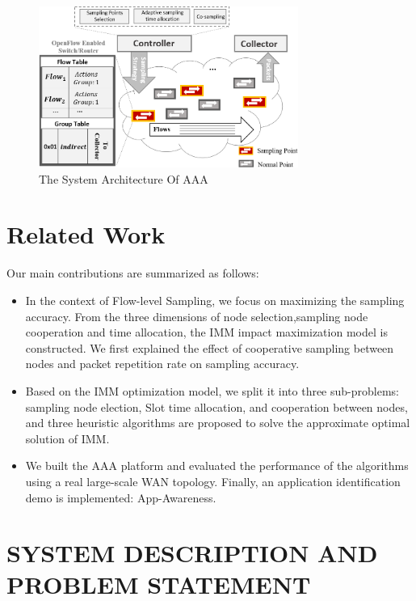 \documentclass[conference,compsoc]{IEEEtran}
\begin{document}
\begin{figure}[!hhhhhhhhhht]
\centering
\includegraphics[width=8.5cm]{images/png_architecture.png}
\caption{The System Architecture Of AAA}
\label{Architecture}
\end{figure}

\section{Related Work}
Our main contributions are summarized as follows:
\begin{itemize}[leftmargin=*]
\setlength{\parindent}{0pt}

\item In the context of Flow-level Sampling, we focus on maximizing the sampling accuracy. From the three dimensions of  node selection,sampling node cooperation and time allocation, the IMM impact maximization model is constructed. We first explained the effect of cooperative sampling between nodes and packet repetition rate on sampling accuracy.
\item Based on the IMM optimization model, we split it into three sub-problems: sampling node election, Slot time allocation, and cooperation between nodes, and three heuristic algorithms are proposed to solve the approximate optimal solution of IMM.
\item We built the AAA platform and evaluated the performance of the algorithms using a real large-scale WAN topology. Finally, an application identification demo is implemented: App-Awareness.
\end{itemize}

\section{SYSTEM DESCRIPTION AND PROBLEM STATEMENT }
\end{document}
